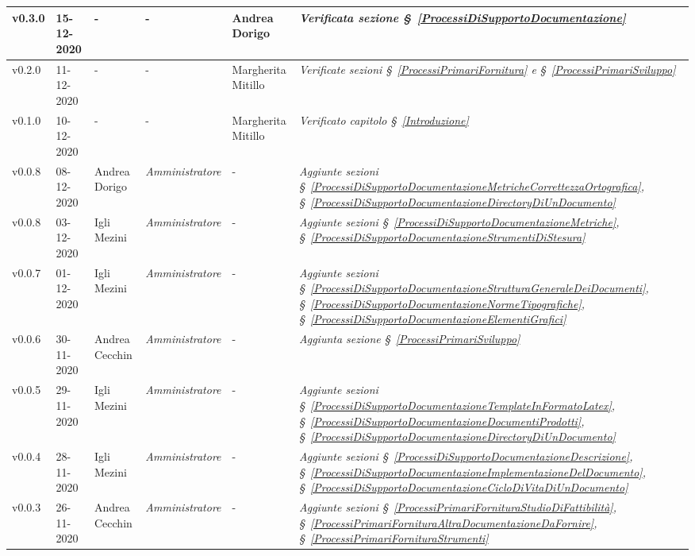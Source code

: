 {\begin{center}
\begin{longtable}[c]{|p{2cm-1\tabcolsep}|p{2cm}|p{3cm-2\tabcolsep}|p{3cm-1.5\tabcolsep}|p{}|p{4cm-2\tabcolsep}|}
		\hline
		\centering v0.3.0 & 15-12-2020 & \centering - & \centering - & Andrea Dorigo & 
		\textit{Verificata sezione \S~\ref{ProcessiDiSupportoDocumentazione}} \\
		\hline
		\centering v0.2.0 & 11-12-2020 & \centering - & \centering - & Margherita Mitillo & \textit{Verificate sezioni \S~\ref{ProcessiPrimariFornitura} e \S~\ref{ProcessiPrimariSviluppo} } \\
		\hline
		\centering v0.1.0 & 10-12-2020 & \centering - & \centering - & Margherita Mitillo & \textit{Verificato capitolo \S~\ref{Introduzione}} \\
		\hline
		\centering v0.0.8 & 08-12-2020 & Andrea Dorigo & \centering \textit{Amministratore} & \centering - & \textit{Aggiunte sezioni \S~\ref{ProcessiDiSupportoDocumentazioneMetricheCorrettezzaOrtografica}, \S~\ref{ProcessiDiSupportoDocumentazioneDirectoryDiUnDocumento}} \\
		\hline
		\centering v0.0.8 & 03-12-2020 & Igli Mezini & \centering \textit{Amministratore} & \centering - & \textit{Aggiunte sezioni \S~\ref{ProcessiDiSupportoDocumentazioneMetriche}, \S~\ref{ProcessiDiSupportoDocumentazioneStrumentiDiStesura}} \\
		\hline
		\centering v0.0.7 & 01-12-2020 & Igli Mezini & \centering \textit{Amministratore} & \centering - & \textit{Aggiunte sezioni \S~\ref{ProcessiDiSupportoDocumentazioneStrutturaGeneraleDeiDocumenti}, \S~\ref{ProcessiDiSupportoDocumentazioneNormeTipografiche}, \S~\ref{ProcessiDiSupportoDocumentazioneElementiGrafici}} \\
		\hline
		\centering v0.0.6 & 30-11-2020 & Andrea Cecchin & \centering \textit{Amministratore} & \centering - & \textit{Aggiunta sezione \S~\ref{ProcessiPrimariSviluppo}} \\
		\hline
		\centering v0.0.5 & 29-11-2020 & Igli Mezini & \centering \textit{Amministratore} & \centering - & \textit{Aggiunte sezioni \S~\ref{ProcessiDiSupportoDocumentazioneTemplateInFormatoLatex}, \S~\ref{ProcessiDiSupportoDocumentazioneDocumentiProdotti}, \S~\ref{ProcessiDiSupportoDocumentazioneDirectoryDiUnDocumento}} \\
		\hline
		\centering v0.0.4 & 28-11-2020 & Igli Mezini & \centering \textit{Amministratore} & \centering - & \textit{Aggiunte sezioni \S~\ref{ProcessiDiSupportoDocumentazioneDescrizione}, \S~\ref{ProcessiDiSupportoDocumentazioneImplementazioneDelDocumento}, \S~\ref{ProcessiDiSupportoDocumentazioneCicloDiVitaDiUnDocumento}} \\
		\hline
		\centering v0.0.3 & 26-11-2020 & Andrea Cecchin & \centering \textit{Amministratore} & \centering - & \textit{Aggiunte sezioni \S~\ref{ProcessiPrimariFornituraStudioDiFattibilità}, \S~\ref{ProcessiPrimariFornituraAltraDocumentazioneDaFornire}, \S~\ref{ProcessiPrimariFornituraStrumenti}} \\

\end{longtable}
\end{center}}
